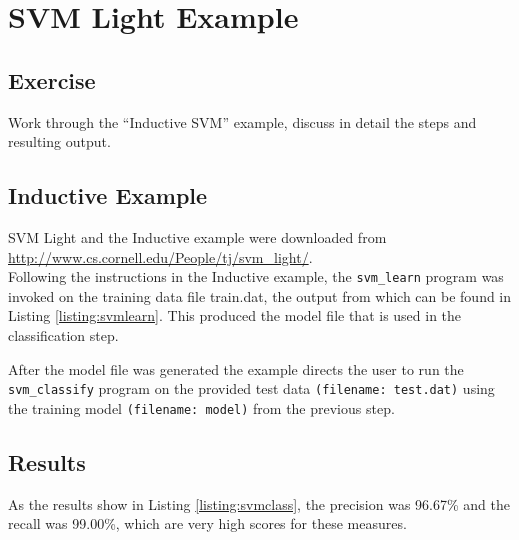\section{SVM Light Example}

\subsection{Exercise}
Work through the ``Inductive SVM'' example, discuss in detail the steps and resulting output.


\subsection{Inductive Example}
SVM Light \cite{svmlight} and the Inductive example were downloaded from \url{http://www.cs.cornell.edu/People/tj/svm_light/}.\\

Following the instructions in the Inductive example, the \texttt{svm\_learn} program was invoked on the training data file train.dat, the output from which can be found in Listing \ref{listing:svmlearn}.  This produced the model file that is used in the classification step.



After the model file was generated the example directs the user to run the \texttt{svm\_classify} program on the provided test data \texttt{(filename: test.dat)} using the training model \texttt{(filename: model)} from the previous step.


\subsection{Results}
As the results show in Listing \ref{listing:svmclass}, the precision was 96.67\% and the recall was 99.00\%, which are very high scores for these measures.  



